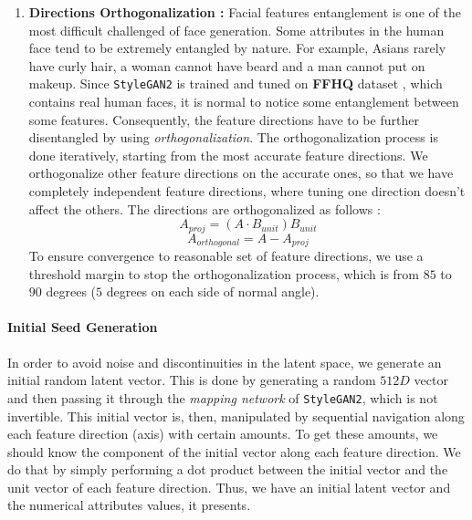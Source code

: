 \begin{enumerate}
    \item \textbf{Directions Orthogonalization :} Facial features entanglement is one of the most difficult challenged of face generation. Some attributes in the human face tend to be extremely entangled by nature. For example, Asians rarely have curly hair, a woman cannot have beard and a man cannot put on makeup. Since \texttt{StyleGAN2} is trained and tuned on \textbf{FFHQ} dataset \cite{karras2019stylebased}, which contains real human faces, it is normal to notice some entanglement between some features. Consequently, the feature directions have to be further disentangled by using \emph{orthogonalization}. The orthogonalization process is done iteratively, starting from the most accurate feature directions. We orthogonalize other feature directions on the accurate ones, so that we have completely independent feature directions, where tuning one direction doesn't affect the others. The directions are orthogonalized as follows :
    \begin{equation}
        A_{proj} = (A \cdot B_{unit}) B_{unit}
    \end{equation}
    \begin{equation}
        A_{orthogonal} = A - A_{proj}
    \end{equation}
    To ensure convergence to reasonable set of feature directions, we use a threshold margin to stop the orthogonalization process, which is from $85$ to $90$ degrees ($5$ degrees on each side of normal angle).
\end{enumerate}

\paragraph{Initial Seed Generation}
In order to avoid noise and discontinuities in the latent space, we generate an initial random latent vector. This is done by generating a random $512D$ vector and then passing it through the \emph{mapping network} of \texttt{StyleGAN2}, which is not invertible. This initial vector is, then, manipulated by sequential navigation along each feature direction (axis) with certain amounts. To get these amounts, we should know the component of the initial vector along each feature direction. We do that by simply performing a dot product between the initial vector and the unit vector of each feature direction. Thus, we have an initial latent vector and the numerical attributes values, it presents. 

